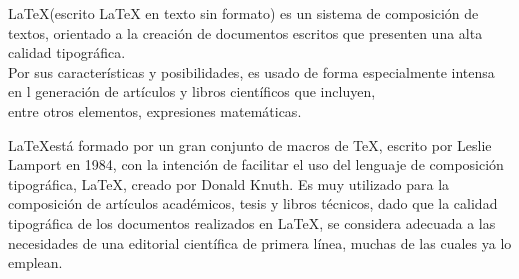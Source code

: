 \documentclass{book}
\begin{document}
\LaTeX (escrito LaTeX en texto sin formato) es     un sistema de composición de textos, orientado a la creación 
de documentos escritos que presenten una alta calidad tipográfica. \\[2pt] Por sus características y posibilidades, es usado de forma especialmente intensa en l generación de artículos y libros científicos que incluyen, \\ entre otros elementos, expresiones matemáticas.

\LaTeX está formado por un gran conjunto de macros de TeX, escrito por Leslie Lamport en 1984, con la intención de facilitar el uso del lenguaje de composición tipográfica, \LaTeX, creado por Donald Knuth. Es muy utilizado para la composición de artículos académicos, tesis y libros técnicos, dado que la calidad tipográfica de los documentos realizados en LaTeX, se considera adecuada a las necesidades de una editorial científica de primera línea, muchas de las cuales ya lo emplean.
\end{document}
